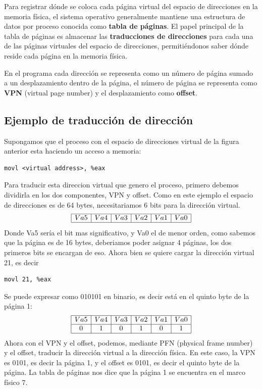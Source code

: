 \documentclass{article}
\begin{document}
Para registrar dónde se coloca cada página virtual del espacio de direcciones en la memoria física, el sistema operativo generalmente mantiene una estructura de datos por proceso conocida como \textbf{tabla de páginas}. El papel principal de la tabla de páginas es almacenar las \textbf{traducciones de direcciones} para cada una de las páginas virtuales del espacio de direcciones, permitiéndonos saber dónde reside cada página en la memoria física. 

En el programa cada dirección se representa como un número de página sumado a un desplazamiento dentro de la página, el número de página se representa como \textbf{VPN} (virtual page number) y el desplazamiento como \textbf{offset}.

\subsection{Ejemplo de traducción de dirección}
Supongamos que el proceso con el espacio de direcciones virtual de la figura anterior esta haciendo un acceso a memoria:
\begin{verbatim}
movl <virtual address>, %eax
\end{verbatim}
Para traducir esta direccion virtual que genero el proceso, primero debemos dividirla en los dos componentes, VPN y offset. Como en este ejemplo el espacio de direcciones es de 64 bytes, necesitariamos 6 bits para la dirección virtual.
\begin{equation*}
    \begin{array}{|c|c|c|c|c|c|}
        \hline
        Va5 & Va4 & Va3 & Va2 & Va1 & Va0 \\
        \hline
    \end{array}
\end{equation*}
Donde Va5 sería el bit mas significativo, y Va0 el de menor orden, como sabemos que la página es de 16 bytes, deberiamos poder asignar 4 páginas, los dos primeros bits se encargan de eso. Ahora bien se quiere cargar la dirección virtual 21, es decir
\begin{verbatim}
movl 21, %eax
\end{verbatim}
Se puede expresar como 010101 en binario, es decir está en el quinto byte de la página 1:
\begin{equation*}
    \begin{array}{|c|c|c|c|c|c|}
        \hline
        Va5 & Va4 & Va3 & Va2 & Va1 & Va0 \\
        \hline
        0 & 1 & 0 & 1 & 0 & 1 \\
        \hline
    \end{array}
\end{equation*}
Ahora con el VPN y el offset, podemos, mediante PFN (physical frame number) y el offset, traducir la dirección virtual a la dirección física. En este caso, la VPN es 0101, es decir la página 1, y el offset es 0101, es decir el quinto byte de la página. La tabla de páginas nos dice que la página 1 se encuentra en el marco físico 7.
\end{document}
